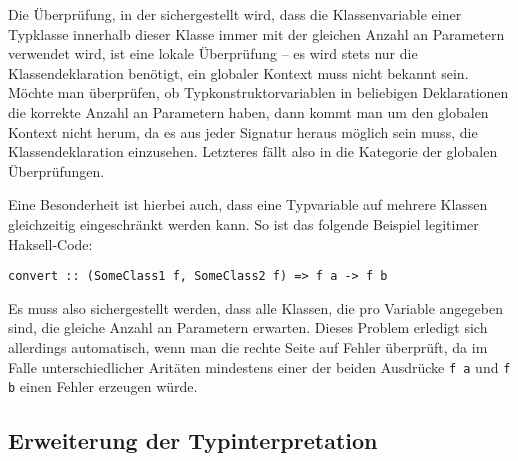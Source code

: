 Die Überprüfung, in der sichergestellt wird, dass die Klassenvariable einer Typklasse innerhalb dieser Klasse immer mit
der gleichen Anzahl an Parametern verwendet wird, ist eine lokale Überprüfung --
es wird stets nur die Klassendeklaration benötigt, ein globaler Kontext muss nicht bekannt sein. Möchte man überprüfen,
ob Typkonstruktorvariablen in beliebigen Deklarationen die korrekte Anzahl an Parametern haben, dann kommt man um den
globalen Kontext nicht herum, da es aus jeder Signatur heraus möglich sein muss, die Klassendeklaration einzusehen. Letzteres
fällt also in die Kategorie der globalen Überprüfungen.

Eine Besonderheit ist hierbei auch, dass eine Typvariable auf mehrere Klassen gleichzeitig eingeschränkt werden kann. So ist
das folgende Beispiel legitimer Haksell-Code:

\begin{verbatim}
convert :: (SomeClass1 f, SomeClass2 f) => f a -> f b
\end{verbatim}


Es muss also sichergestellt werden, dass alle Klassen, die pro Variable angegeben sind, die gleiche Anzahl an Parametern erwarten.
Dieses Problem erledigt sich allerdings automatisch, wenn man die rechte Seite auf Fehler überprüft, da im Falle unterschiedlicher
Aritäten mindestens einer der beiden Ausdrücke \texttt{f a} und \texttt{f b} einen Fehler erzeugen würde.


\subsection{Erweiterung der Typinterpretation}

\label{sec:extend-interpret}


